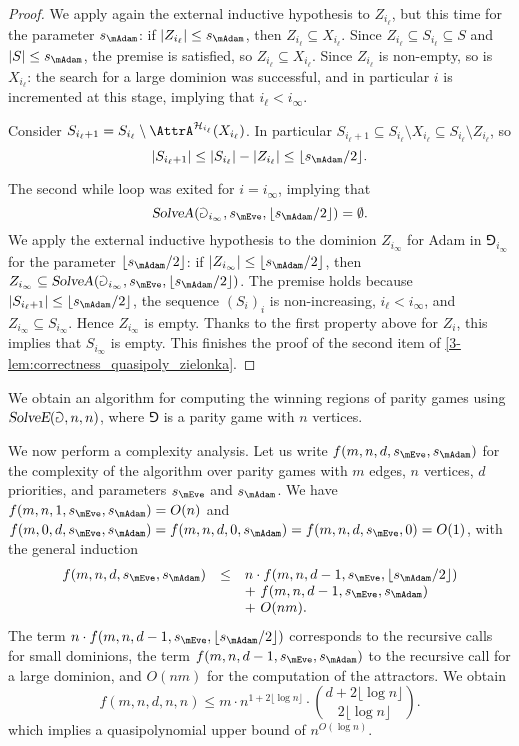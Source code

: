 \begin{proof}
We apply again the external inductive hypothesis to $Z_{i_\ell}$, but this time 
for the parameter $s_{\mAdam}$: 
if $|Z_{i_\ell}| \le s_{\mAdam}$, then $Z_{i_\ell} \subseteq X_{i_\ell}$.
Since $Z_{i_\ell} \subseteq S_{i_\ell} \subseteq S$ and $|S| \le s_{\mAdam}$, the premise is satisfied,
so $Z_{i_\ell} \subseteq X_{i_\ell}$.
Since $Z_{i_\ell}$ is non-empty, so is $X_{i_\ell}$: the search for a large dominion was successful, and in particular
$i$ is incremented at this stage, implying that $i_\ell < i_\infty$.

Consider $S_{i_\ell + 1} = S_{i_\ell} \setminus \AttrA^{\H_{i_\ell}}(X_{i_\ell})$.
In particular $S_{i_\ell + 1} \subseteq S_{i_\ell} \setminus X_{i_\ell} \subseteq S_{i_\ell} \setminus Z_{i_\ell}$, so
\[
|S_{i_\ell + 1}| \le |S_{i_\ell}| - |Z_{i_\ell}| \le \lfloor s_{\mAdam} / 2 \rfloor.
\]

The second while loop was exited for $i = i_{\infty}$, implying that 
\[
\textsl{SolveA}(\Game_{i_{\infty}},s_{\mEve},\lfloor s_{\mAdam} / 2 \rfloor) = \emptyset.
\]		
We apply the external inductive hypothesis to the dominion $Z_{i_{\infty}}$ for Adam in $\Game_{i_{\infty}}$
for the parameter $\lfloor s_{\mAdam} / 2 \rfloor$: if $|Z_{i_{\infty}}| \le \lfloor s_{\mAdam} / 2 \rfloor$, then
$Z_{i_{\infty}} \subseteq \textsl{SolveA}(\Game_{i_{\infty}},s_{\mEve},\lfloor s_{\mAdam} / 2 \rfloor)$.
The premise holds because $|S_{i_\ell + 1}| \le \lfloor s_{\mAdam} / 2 \rfloor$, the sequence $(S_i)_i$ is non-increasing, 
$i_\ell < i_\infty$, and $Z_{i_{\infty}} \subseteq S_{i_\infty}$.
Hence $Z_{i_\infty}$ is empty. Thanks to the first property above for $Z_i$, this implies that $S_{i_\infty}$ is empty.
This finishes the proof of the second item of \cref{3-lem:correctness_quasipoly_zielonka}.
\end{proof}

We obtain an algorithm for computing the winning regions of parity games using $\textsl{SolveE}(\Game,n,n)$,
where $\Game$ is a parity game with $n$ vertices.

We now perform a complexity analysis.
Let us write $f(m,n,d,s_{\mEve},s_{\mAdam})$ for the complexity of the algorithm over parity games with $m$ edges, $n$ vertices, $d$ priorities,
and parameters $s_{\mEve}$ and $s_{\mAdam}$.
We have $f(m,n,1,s_{\mEve},s_{\mAdam}) = O(n)$ and $f(m,0,d,s_{\mEve},s_{\mAdam}) = f(m,n,d,0,s_{\mAdam}) = f(m,n,d,s_{\mEve},0) = O(1)$, 
with the general induction 
\[
\begin{array}{lll}
f(m,n,d,s_{\mEve},s_{\mAdam}) & \le & n \cdot f(m,n,d-1,s_{\mEve},\lfloor s_{\mAdam} / 2 \rfloor) \\
							  & & +\ f(m,n,d-1,s_{\mEve},s_{\mAdam}) \\
							  & & +\ O(nm).
\end{array}
\]
The term $n \cdot f(m,n,d-1,s_{\mEve},\lfloor s_{\mAdam} / 2 \rfloor)$ corresponds to the recursive calls for small dominions, 
the term $f(m,n,d-1,s_{\mEve},s_{\mAdam})$ to the recursive call for a large dominion,
and $O(nm)$ for the computation of the attractors.
We obtain
\[
f(m,n,d,n,n) \le m \cdot n^{1 + 2 \lfloor \log n \rfloor} \cdot \binom{d + 2 \lfloor \log n \rfloor}{2 \lfloor \log n \rfloor}.
\]
which implies a quasipolynomial upper bound of $n^{O(\log n)}$.

